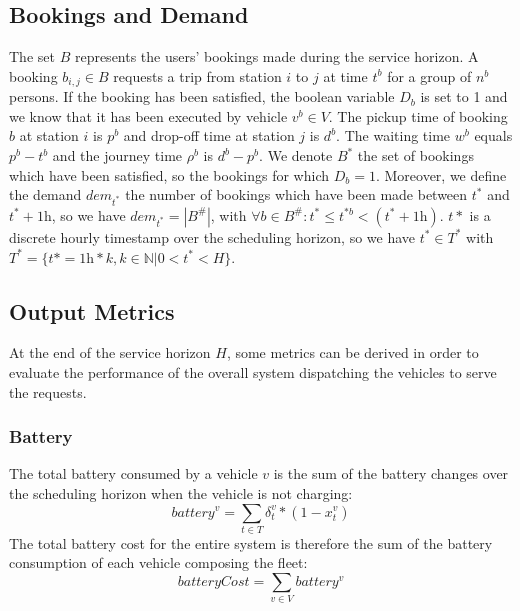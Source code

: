 \documentclass[12pt,a4paper]{article}
\begin{document}
\subsection{Bookings and Demand}\label{bookings}
The set $B$ represents the users' bookings made during the service horizon. A booking $b_{i,j} \in B$ requests a trip from station $i$ to $j$ at time $t^{b}$ for a group of $n^{b}$ persons. If the booking has been satisfied, the boolean variable $D_{b}$ is set to 1 and we know that it has been executed by vehicle $v^{b} \in V$. The pickup time of booking $b$ at station $i$ is $p^{b}$ and drop-off time at station $j$ is $d^{b}$. The waiting time  $w^{b}$ equals $p^{b} - t^{b}$ and the journey time $\rho^{b}$ is $d^{b} - p^{b}$. We denote $B^{*}$ the set of bookings which have been satisfied, so the bookings for which $D_{b} = 1$. Moreover, we define the demand $dem_{t^{*}}$ the number of bookings which have been made between $t^{*}$ and $t^{*} + 1\text{h}$, so we have $dem_{t^{*}} = |B^{\#}|$, with $\forall b \in B^{\#}: t^{*} \leq t^{*b} < (t^{*}+1\text{h})$. $t{*}$ is a discrete hourly timestamp over the scheduling horizon, so we have $t^{*} \in T^{*}$ with $T^{*} = \{t* = 1\text{h} * k, k \in \mathbb{N} | 0 < t^{*} < H\}$.

\subsection{Output Metrics}\label{metrics}
At the end of the service horizon $H$, some metrics can be derived in order to evaluate the performance of the overall system dispatching the vehicles to serve the requests. 

\subsubsection*{Battery}
The total battery consumed by a vehicle $v$ is the sum of the battery changes over the scheduling horizon when the vehicle is not charging:
$$battery^{v} = \sum_{t \in T}\delta^{v}_{t} * (1-x^{v}_{t}) $$
The total battery cost for the entire system is therefore the sum of the battery consumption of each vehicle composing the fleet:
$$batteryCost = \sum_{v \in V}battery^{v}$$
\end{document}
